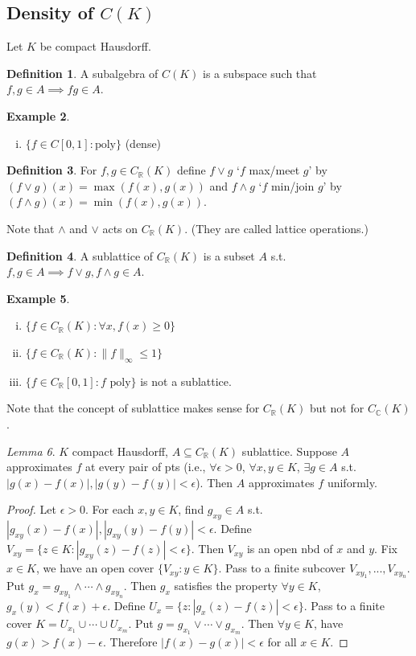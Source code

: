 \documentclass{article}
\theoremstyle{definition}
\newtheorem{defn}{Definition}[section]
\newtheorem{example}[defn]{Example}
\theoremstyle{remark}
\newtheorem{lem}[defn]{Lemma}
\theoremstyle{plain}
\newcommand{\RR}{\mathbb{R}}
\newcommand{\CC}{\mathbb{C}}
\begin{document}
\subsection{Density of $C(K)$}
Let $K$ be compact Hausdorff.
\begin{defn}
    A subalgebra of $C(K)$ is a subspace such that $f,g\in A\implies fg\in A$.
\end{defn}
\begin{example}
    \begin{enumerate}[(i)]
        \item $\{f\in C[0,1]:\text{poly}\}$ (dense)
    \end{enumerate}
\end{example}
\begin{defn}
    For $f,g\in C_{\RR}(K)$ define $f\vee g$ `$f$ max/meet $g$' by $(f\vee g)(x)=\max(f(x),g(x))$ and $f\wedge g$ `$f$ min/join $g$' by $(f\wedge g)(x)=\min(f(x),g(x))$.
\end{defn}
Note that $\wedge$ and $\vee$ acts on $C_\RR(K)$. (They are called lattice operations.)
\begin{defn}
    A sublattice of $C_\RR(K)$ is a subset $A$ s.t. $f,g\in A\implies f\vee g, f\wedge g\in A$.
\end{defn}
\begin{example}
    \begin{enumerate}[(i)]
        \item $\{f\in C_\RR(K):\forall x,f(x)\ge 0\}$
        \item $\{f\in C_\RR(K): \|f\|_\infty\le 1\}$
        \item $\{f\in C_\RR[0,1]:f\text{ poly}\}$ is not a sublattice.
    \end{enumerate}   
\end{example}
Note that the concept of sublattice makes sense for $C_\RR(K)$ but not for $C_\CC(K)$.
\begin{lem}
    $K$ compact Hausdorff, $A\subseteq C_\RR(K)$ sublattice. Suppose $A$ approximates $f$ at every pair of pts (i.e., $\forall \epsilon>0$, $\forall x,y\in K$, $\exists g\in A$ s.t. $|g(x)-f(x)|,|g(y)-f(y)|<\epsilon$). Then $A$ approximates $f$ uniformly.
\end{lem}
\begin{proof}
    Let $\epsilon>0$. For each $x,y\in K$, find $g_{xy}\in A$ s.t. $|g_{xy}(x)-f(x)|,|g_{xy}(y)-f(y)|<\epsilon$. Define $V_{xy}=\{z\in K:|g_{xy}(z)-f(z)|<\epsilon\}$. Then $V_{xy}$ is an open nbd of $x$ and $y$. Fix $x\in K$, we have an open cover $\{V_{xy}:y\in K\}$. Pass to a finite subcover $V_{xy_1},...,V_{xy_n}$. Put $g_x=g_{xy_1}\wedge\cdots\wedge g_{xy_n}$. Then $g_x$ satisfies the property $\forall y\in K$, $g_x(y)<f(x)+\epsilon$. Define $U_x=\{z:|g_x(z)-f(z)|<\epsilon\}$. Pass to a finite cover $K=U_{x_1}\cup\cdots\cup U_{x_m}$. Put $g=g_{x_1}\vee\cdots\vee g_{x_m}$. Then $\forall y\in K$, have $g(x)>f(x)-\epsilon$.
    Therefore $|f(x)-g(x)|<\epsilon$ for all $x\in K$.
\end{proof}
\end{document}
